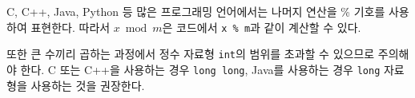 C, C++, Java, Python 등 많은 프로그래밍 언어에서는 나머지 연산을 \% 기호를 사용하여 표현한다. 따라서 $x \bmod m$은 코드에서 \texttt{x \% m}과 같이 계산할 수 있다.

또한 큰 수끼리 곱하는 과정에서 정수 자료형 \texttt{int}의 범위를 초과할 수 있으므로 주의해야 한다. C 또는 C++을 사용하는 경우 \texttt{long long}, Java를 사용하는 경우 \texttt{long} 자료형을 사용하는 것을 권장한다.